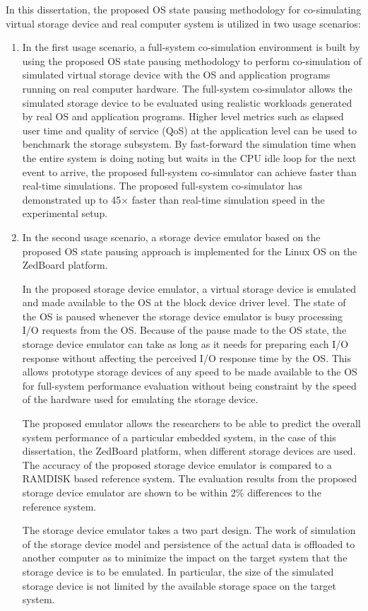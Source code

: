 In this dissertation, the proposed OS state pausing methodology for co-simulating virtual storage device and real computer system is utilized in two usage scenarios:

\begin{enumerate}
	
	\item In the first usage scenario, a full-system co-simulation environment is built by using the proposed OS state pausing methodology to perform co-simulation of simulated virtual storage device with the OS and application programs running on real computer hardware. The full-system co-simulator allows the simulated storage device to be evaluated using realistic workloads generated by real OS and application programs. Higher level metrics such as elapsed user time and quality of service (QoS) at the application level can be used to benchmark the storage subsystem. By fast-forward the simulation time when the entire system is doing noting but waits in the CPU idle loop for the next event to arrive, the proposed full-system co-simulator can achieve faster than real-time simulations. The proposed full-system co-simulator has demonstrated up to 45$\times$ faster than real-time simulation speed in the experimental setup.
	
	\item In the second usage scenario, a storage device emulator based on the proposed OS state pausing approach is implemented for the Linux OS on the ZedBoard platform.
		
	In the proposed storage device emulator, a virtual storage device is emulated and made available to the OS at the block device driver level. The state of the OS is paused whenever the storage device emulator is busy processing I/O requests from the OS. Because of the pause made to the OS state, the storage device emulator can take as long as it needs for preparing each I/O response without affecting the perceived I/O response time by the OS. This allows prototype storage devices of any speed to be made available to the OS for full-system performance evaluation without being constraint by the speed of the hardware used for emulating the storage device.
	
	The proposed emulator allows the researchers to be able to predict the overall system performance of a particular embedded system, in the case of this dissertation, the ZedBoard platform, when different storage devices are used. The accuracy of the proposed storage device emulator is compared to a RAMDISK based reference system. The evaluation results from the proposed storage device emulator are shown to be within 2\% differences to the reference system.
	
	The storage device emulator takes a two part design. The work of simulation of the storage device model and persistence of the actual data is offloaded to another computer as to minimize the impact on the target system that the storage device is to be emulated. In particular, the size of the simulated storage device is not limited by the available storage space on the target system.

\end{enumerate}

